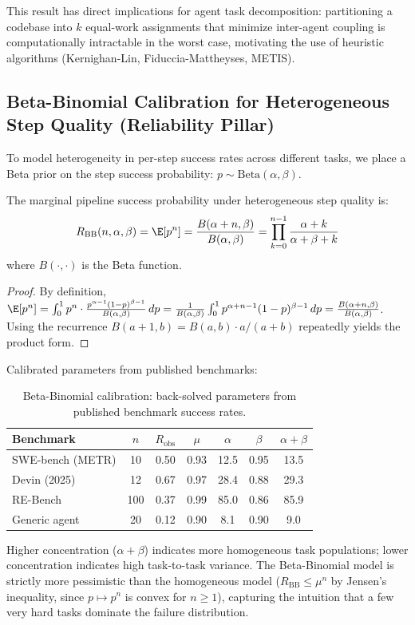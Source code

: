 This result has direct implications for agent task decomposition:
partitioning a codebase into $k$ equal-work assignments that minimize
inter-agent coupling is computationally intractable in the worst case,
motivating the use of heuristic algorithms (Kernighan-Lin, Fiduccia-Mattheyses, METIS).


\subsection{Beta-Binomial Calibration for Heterogeneous Step Quality (Reliability Pillar)}

To model heterogeneity in per-step success rates across different tasks,
we place a Beta prior on the step success probability:
$p \sim \mathrm{Beta}(\alpha, \beta)$.

\begin{theorem}
The marginal pipeline success probability under heterogeneous step quality is:
\[
  R_{\mathrm{BB}}(n, \alpha, \beta)
    = \E[p^n]
    = \frac{B(\alpha + n, \beta)}{B(\alpha, \beta)}
    = \prod_{k=0}^{n-1} \frac{\alpha + k}{\alpha + \beta + k}
\]
where $B(\cdot, \cdot)$ is the Beta function.
\end{theorem}

\begin{proof}
By definition, $\E[p^n] = \int_0^1 p^n \cdot \frac{p^{\alpha-1}(1-p)^{\beta-1}}{B(\alpha,\beta)} \, dp
= \frac{1}{B(\alpha,\beta)} \int_0^1 p^{\alpha+n-1}(1-p)^{\beta-1} \, dp
= \frac{B(\alpha+n, \beta)}{B(\alpha,\beta)}$.
Using the recurrence $B(a+1,b) = B(a,b) \cdot a/(a+b)$ repeatedly yields
the product form.
\end{proof}

Calibrated parameters from published benchmarks:

\begin{table}[htbp]
\centering
\caption{Beta-Binomial calibration: back-solved parameters from published benchmark success rates.}
\label{tab:ext-betabinom}
\small
\begin{tabular}{lcccccc}
\toprule
\textbf{Benchmark} & $n$ & $R_{\mathrm{obs}}$ & $\mu$ & $\alpha$ & $\beta$ & $\alpha{+}\beta$ \\
\midrule
SWE-bench (METR) & 10 & 0.50 & 0.93 & 12.5 & 0.95 & 13.5 \\
Devin (2025) & 12 & 0.67 & 0.97 & 28.4 & 0.88 & 29.3 \\
RE-Bench & 100 & 0.37 & 0.99 & 85.0 & 0.86 & 85.9 \\
Generic agent & 20 & 0.12 & 0.90 & 8.1 & 0.90 & 9.0 \\
\bottomrule
\end{tabular}
\end{table}

Higher concentration ($\alpha + \beta$) indicates more homogeneous task
populations; lower concentration indicates high task-to-task variance.
The Beta-Binomial model is strictly more pessimistic than the homogeneous model
($R_{\mathrm{BB}} \leq \mu^n$ by Jensen's inequality, since $p \mapsto p^n$
is convex for $n \geq 1$), capturing the intuition that a few very hard tasks
dominate the failure distribution.
